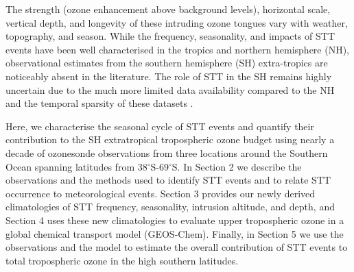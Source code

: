 \documentclass[acp, manuscript]{copernicus} %
\begin{document}
  The strength (ozone enhancement above background levels), horizontal scale, vertical depth, and longevity of these intruding ozone tongues vary with weather, topography, and season.
  While the frequency, seasonality, and impacts of STT events have been well characterised in the tropics and northern hemisphere (NH), observational estimates from the southern hemisphere (SH) extra-tropics are noticeably absent in the literature. 
  The role of STT in the SH remains highly uncertain due to the much more limited data availability compared to the NH and the temporal sparsity of these datasets \citep{Mze2010, Thompson2014, Liu2015}. 

  Here, we characterise the seasonal cycle of STT events and quantify their contribution to the SH extratropical tropospheric ozone budget using nearly a decade of ozonesonde observations from three locations around the Southern Ocean spanning latitudes from 38$^{\circ}$S-69$^{\circ}$S. 
  In Section 2 we describe the observations and the methods used to identify STT events and to relate STT occurrence to meteorological events.
  Section 3 provides our newly derived climatologies of STT frequency, seasonality, intrusion altitude, and depth, and Section 4 uses these new climatologies to evaluate upper tropospheric ozone in a global chemical transport model (GEOS-Chem). 
  Finally, in Section 5 we use the observations and the model to estimate the overall contribution of STT events to total tropospheric ozone in the high southern latitudes.
\end{document}
